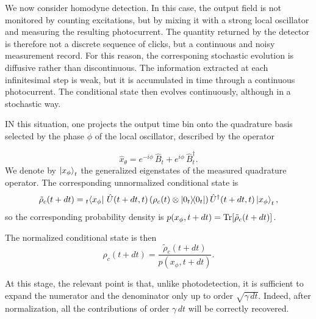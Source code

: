 We now consider homodyne detection. In this case, the output field is not monitored by counting excitations, but by mixing it with a strong local oscillator and measuring the resulting photocurrent. The quantity returned by the detector is therefore not a discrete sequence of clicks, but a continuous and noisy measurement record. For this reason, the corresponing stochastic evolution is diffusive rather than discontinuous. The information extracted at each infinitesimal step is weak, but it is accumulated in time through a continuous photocurrent. The conditional state then evolves continuously, although in a stochastic way.

IN this situation, one projects the output time bin onto the quadrature basis selected by the phase \(\phi\) of the local oscillator, described by the operator

\begin{equation}
	\hat x_{\theta}
	=
	e^{-i\phi}\,\hat B_t + e^{i\phi}\,\hat B_t^\dagger.
	\label{eq:sme_homodyne_measured_quadrature}
\end{equation}
We denote by \(\ket{x_\phi}_t\) the generalized eigenstates of the measured quadrature operator. The corresponding unnormalized conditional state is
\begin{equation}
	\tilde{\rho}_c(t+dt)
	=
	{}_t\!\bra{x_\phi}\,
	\hat U(t+dt,t)
	\left(
	\rho_c(t)\otimes\dyad{0_t}{0_t}
	\right)
	\hat U^\dagger(t+dt,t)
	\ket{x_\phi}_t ,
	\label{eq:homodyne_unnormalized_conditional_state}
\end{equation}
so the corresponding probability density is $p(x_\phi,t+dt)=\Tr\!\left[\tilde{\rho}_c(t+dt)\right].$

The normalized conditional state is then
\begin{equation}
	\rho_c(t+dt)=\frac{\tilde{\rho}_c(t+dt)}{p(x_\phi,t+dt)}.
	\label{eq:homodyne_normalized_conditional_state}
\end{equation}

At this stage, the relevant point is that, unlike photodetection, it is sufficient to expand the numerator and the denominator only up to order \(\sqrt{\gamma\,dt}\). Indeed, after normalization, all the contributions of order \(\gamma\,dt\) will be correctly recovered.

